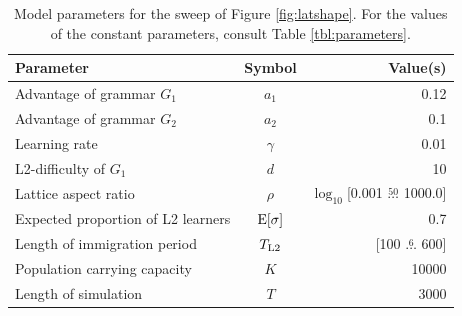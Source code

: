 \begin{table}\caption{Model parameters for the sweep of Figure \ref{fig:latshape}. For the values of the constant parameters, consult Table \ref{tbl:parameters}.}\label{tbl:latshape}\begin{tabular}{lcr}
\toprule
Parameter & Symbol & Value(s) \\
\midrule
Advantage of grammar $G_1$ & $a_1$ & 0.12 \\
Advantage of grammar $G_2$ & $a_2$ & 0.1 \\
Learning rate & $\gamma$ & 0.01 \\
L2-difficulty of $G_1$ & $d$ & 10 \\
Lattice aspect ratio & $\rho$ & $\log_{10}$[0.001 $\stackrel{50}{\ldots}$ 1000.0] \\
Expected proportion of L2 learners & $\textnormal{E}[\sigma]$ & 0.7 \\
Length of immigration period & $T_\textnormal{L2}$ & [100 $\stackrel{6}{\ldots}$ 600] \\
Population carrying capacity & $K$ & 10000 \\
Length of simulation & $T$ & 3000 \\
\bottomrule
\end{tabular}
\end{table}
